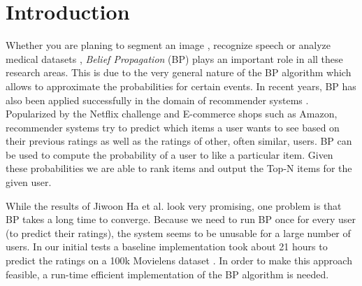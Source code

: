 
\section{Introduction}\label{sec:intro}

Whether you are planing to segment an image \cite{1544822}, recognize speech \cite{5373446} or analyze medical datasets \cite{bailly2011finding}, \textit{Belief Propagation} (BP) plays an important role in all these research areas. This is due to the very general nature of the BP algorithm which allows to approximate the probabilities for certain events. In recent years, BP has also been applied successfully in the domain of recommender systems \cite{Ha:2012:TRT:2396761.2398636}. Popularized by the Netflix challenge and E-commerce shops such as Amazon, recommender systems try to predict which items a user wants to see based on their previous ratings as well as the ratings of other, often similar, users. BP can be used to compute the probability of a user to like a particular item. Given these probabilities we are able to rank items and output the Top-N items for the given user.

 




While the results of Jiwoon Ha et al.\cite{Ha:2012:TRT:2396761.2398636} look very promising, one problem is that BP takes a long time to converge. Because we need to run BP once for every user (to predict their ratings), the system seems to be unusable for a large number of users. In our initial tests a baseline implementation took about 21 hours to predict the ratings on a 100k Movielens dataset \cite{riedl1998movielens}. In order to make this approach feasible, a  run-time efficient implementation of the BP algorithm is needed.

